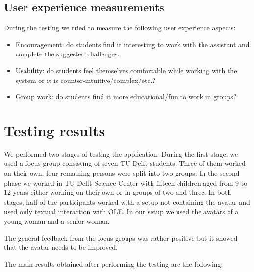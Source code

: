 \documentclass[a4paper]{article}
\begin{document}
\subsection{User experience measurements}

During the testing we tried to measure the following user experience aspects:

\begin{itemize}
	\item Encouragement: do students find it interesting to work with the assistant and complete the suggested challenges.
	\item Usability: do students feel themselves comfortable while working with the system or it is counter-intuitive/complex/etc.?
	\item Group work: do students find it more educational/fun to work in groups? 
\end{itemize}

\section{Testing results}

We performed two stages of testing the application. During the first stage, we used a focus group consisting of seven TU Delft students. Three of them worked on their own, four remaining persons were split into two groups. In the second phase we worked in TU Delft Science Center with fifteen children aged from 9 to 12 years either working on their own or in groups of two and three. In both stages, half of the participants worked with a setup not containing the avatar and used only textual interaction with OLE. In our setup we used the avatars of a young woman and a senior woman.

The general feedback from the focus groups was rather positive but it showed that the avatar needs to be improved.

The main results obtained after performing the testing are the following.
\end{document}
